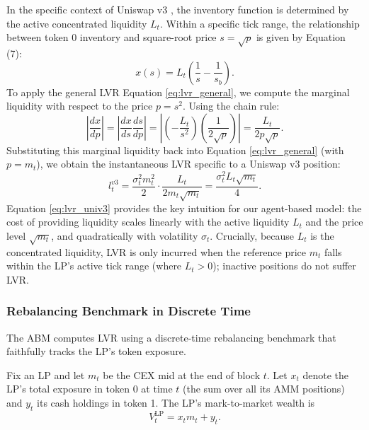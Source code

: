 \documentclass[11pt]{article}
\begin{document}
In the specific context of Uniswap v3 , the inventory function is determined by the active concentrated liquidity $L_t$. 
Within a specific tick range, the relationship between token 0 inventory and square-root price $s = \sqrt{p}$ is 
given by Equation (7):
\begin{equation}
    x(s) = L_t \left( \frac{1}{s} - \frac{1}{s_b} \right).
\end{equation}
To apply the general LVR Equation \ref{eq:lvr_general}, we compute the marginal liquidity with respect to the price $p = s^2$. Using the chain rule:
\begin{equation}
    \left| \frac{dx}{dp} \right| = \left| \frac{dx}{ds} \frac{ds}{dp} \right| = \left| \left( -\frac{L_t}{s^2} \right) \left( \frac{1}{2\sqrt{p}} \right) \right| = \frac{L_t}{2 p \sqrt{p}}.
\end{equation}
Substituting this marginal liquidity back into Equation \ref{eq:lvr_general} (with $p = m_t$), we obtain the instantaneous LVR specific to a Uniswap v3 position:
\begin{equation}
    l_t^{v3} = \frac{\sigma_t^2 m_t^2}{2} \cdot \frac{L_t}{2 m_t \sqrt{m_t}} = \frac{\sigma_t^2 L_t \sqrt{m_t}}{4}.
    \label{eq:lvr_univ3}
\end{equation}
Equation \ref{eq:lvr_univ3} provides the key intuition for our agent-based model: the cost of providing liquidity scales linearly with the active liquidity $L_t$ and the price level $\sqrt{m_t}$, and quadratically with volatility $\sigma_t$. Crucially, because $L_t$ is the concentrated liquidity, LVR is only incurred when the reference price $m_t$ falls within the LP's active tick range (where $L_t > 0$); inactive positions do not suffer LVR.

\subsubsection{Rebalancing Benchmark in Discrete Time}

The ABM computes LVR using a discrete-time rebalancing benchmark that faithfully
tracks the LP's token exposure.

Fix an LP and let $m_t$ be the CEX mid at the end of block $t$.
Let $x_t$ denote the LP's total exposure in token 0 at time $t$ (the sum over all its AMM
positions) and $y_t$ its cash holdings in token 1. The LP's mark-to-market wealth is
\begin{equation}
  V_t^{\mathrm{LP}} = x_t m_t + y_t.
\end{equation}
\end{document}

